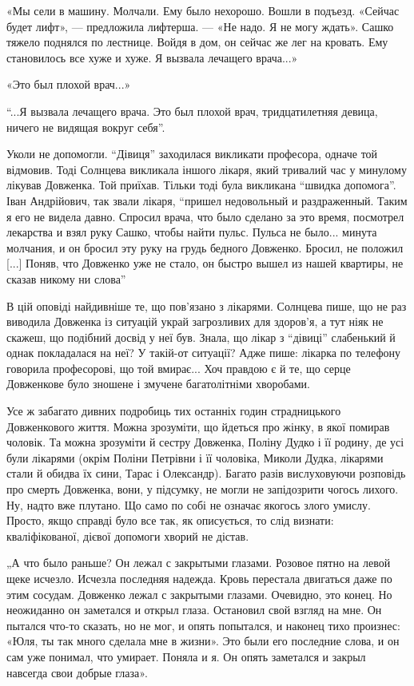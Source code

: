 «Мы сели в машину. Молчали. Ему было нехорошо. Вошли в подъезд. «Сейчас будет
лифт», — предложила лифтерша. — «Не надо. Я не могу ждать». Сашко тяжело
поднялся по лестнице. Войдя в дом, он сейчас же лег на кровать. Ему
становилось все хуже и хуже. Я вызвала лечащего врача...» 

«Это был плохой врач...»

\enquote{...Я вызвала лечащего врача. Это был плохой врач, тридцатилетняя девица, ничего
не видящая вокруг себя}. 

Уколи не допомогли. \enquote{Дівиця} заходилася викликати професора, одначе той
відмовив. Тоді Солнцева викликала  іншого лікаря, який тривалий час у минулому
лікував Довженка. Той приїхав. Тільки тоді була викликана \enquote{швидка допомога}.
Іван Андрійович, так звали лікаря, \enquote{пришел недовольный и раздраженный. Таким я
его не видела  давно. Спросил врача, что было сделано за это время, посмотрел
лекарства и взял руку Сашко, чтобы найти пульс.  Пульса не  было... минута
молчания, и он бросил эту руку на грудь бедного Довженко. Бросил, не положил
[...] Поняв, что Довженко уже не стало, он быстро вышел из нашей квартиры, не
сказав никому ни слова}

В цій оповіді найдивніше те, що пов'язано з лікарями.  Солнцева пише, що не раз
виводила Довженка із ситуацій украй загрозливих для здоров'я, а тут ніяк не
скажеш, що подібний досвід у неї був. Знала, що лікар з \enquote{дівиці} слабенький й
однак покладалася на неї? У такій-от ситуації? Адже пише: лікарка по телефону
говорила професорові, що той вмирає... Хоч правдою є й те, що серце Довженкове
було зношене і змучене багатолітніми хворобами.

Усе ж забагато дивних подробиць тих останніх годин страдницького
Довженкового життя. Можна зрозуміти, що йдеться про жінку, в якої помирав
чоловік. Та можна зрозуміти й сестру Довженка, Поліну Дудко і її  родину, де
усі були лікарями (окрім  Поліни Петрівни і її чоловіка, Миколи Дудка,
лікарями стали й обидва їх сини, Тарас і Олександр). Багато разів
вислуховуючи розповідь про смерть Довженка, вони, у підсумку, не могли не
запідозрити чогось лихого. Ну, надто вже плутано. Що само по собі не означає
якогось злого умислу. Просто, якщо справді було все так, як описується, то
слід визнати: кваліфікованої, дієвої допомоги хворий не дістав.

„А что было раньше?    Он лежал с закрытыми глазами. Розовое пятно на
левой щеке исчезло. Исчезла последняя надежда.  Кровь перестала двигаться
даже по этим сосудам. Довженко лежал с закрытыми глазами. Очевидно, это
конец. Но неожиданно он заметался и открыл глаза. Остановил свой взгляд на
мне. Он пытался что-то сказать, но не мог, и опять попытался, и наконец
тихо произнес: «Юля, ты так много сделала мне в жизни». Это были его
последние слова, и он сам уже понимал, что умирает. Поняла и я. Он опять
заметался и закрыл навсегда свои добрые глаза». 

